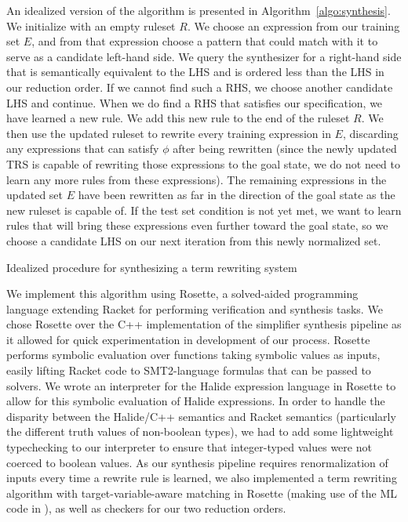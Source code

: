 An idealized version of the algorithm is presented in Algorithm~\ref{algo:synthesis}. We initialize with an empty ruleset $R$. We choose an expression from our training set $E$, and from that expression choose a pattern that could match with it to serve as a candidate left-hand side. We query the synthesizer for a right-hand side that is semantically equivalent to the LHS and is ordered less than the LHS in our reduction order. If we cannot find such a RHS, we choose another candidate LHS and continue. When we do find a RHS that satisfies our specification, we have learned a new rule. We add this new rule to the end of the ruleset $R$. We then use the updated ruleset to rewrite every training expression in $E$, discarding any expressions that can satisfy $\phi$ after being rewritten (since the newly updated TRS is capable of rewriting those expressions to the goal state, we do not need to learn any more rules from these expressions). The remaining expressions in the updated set $E$ have been rewritten as far in the direction of the goal state as the new ruleset is capable of. If the test set condition is not yet met, we want to learn rules that will bring these expressions even further toward the goal state, so we choose a candidate LHS on our next iteration from this newly normalized set.

\begin{algorithm}[H]
\SetAlgoLined
{}
\caption{Idealized procedure for synthesizing a term rewriting system}
\label{algo:synthesis}
\end{algorithm}

We implement this algorithm using Rosette, a solved-aided programming language extending Racket for performing verification and synthesis tasks. We chose Rosette over the C++ implementation of the simplifier synthesis pipeline as it allowed for quick experimentation in development of our process. Rosette performs symbolic evaluation over functions taking symbolic values as inputs, easily lifting Racket code to SMT2-language formulas that can be passed to solvers. We wrote an interpreter for the Halide expression language in Rosette to allow for this symbolic evaluation of Halide expressions. In order to handle the disparity between the Halide/C++ semantics and Racket semantics (particularly the different truth values of non-boolean types), we had to add some lightweight typechecking to our interpreter to ensure that integer-typed values were not coerced to boolean values. As our synthesis pipeline requires renormalization of inputs every time a rewrite rule is learned, we also implemented a term rewriting algorithm with target-variable-aware matching in Rosette (making use of the ML code in \cite{baader1999term}), as well as checkers for our two reduction orders. 

